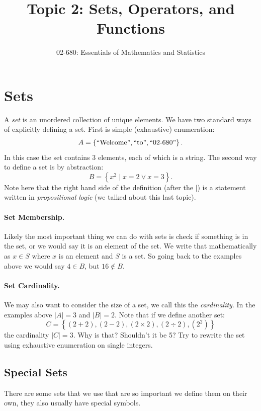 


\title{Topic 2: Sets, Operators, and Functions}
\author{02-680: Essentials of Mathematics and Statistics}


\maketitle

\section{Sets}
A \emph{set} is an unordered collection of unique elements. 
We have two standard ways of explicitly defining a set. 
First is simple (exhaustive) enumeration:
\[
A = \left\{\textnormal{``Welcome''}, \textnormal{``to''}, \textnormal{``02-680''}\right\}.
\]
In this case the set contains 3 elements, each of which is a string.
The second way to define a set is by abstraction:
\[
B = \left\{x^2 \mid x=2 \vee x=3 \right\}.
\]
Note here that the right hand side of the definition (after the $\mid$) is a statement written in \emph{propositional logic} (we talked about this last topic).

\paragraph{Set Membership.} Likely the most important thing we can do with sets is check if something is in the set, 
or we would say it is an element of the set. 
We write that mathematically as $x \in S$ where $x$ is an element and $S$ is a set. 
So going back to the examples above we would say $4 \in B$, but $16 \notin B$.

\paragraph{Set Cardinality.} 
We may also want to consider the size of a set, we call this the \emph{cardinality}.
In the examples above $|A|=3$ and $|B| = 2$.
Note that if we define another set:
\[
C = \left\{ \left(2+2\right), \left(2-2\right), \left(2\times2\right), \left(2\div2\right), \left(2^2\right) \right\}
\]
the cardinality $|C|=3$. 
Why is that? Shouldn't it be 5? 
Try to rewrite the set using exhaustive enumeration on single integers.

\subsection{Special Sets}
There are some sets that we use that are so important we define them on their own, they also usually have special symbols. 

